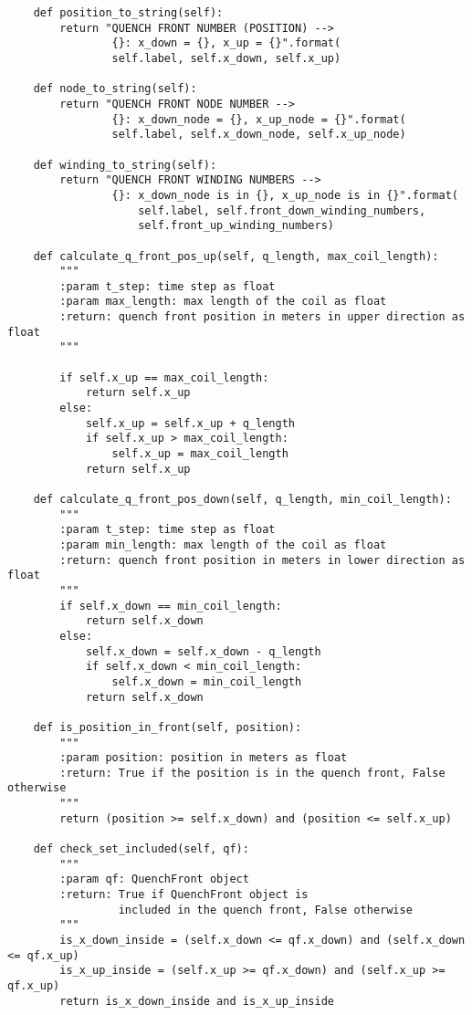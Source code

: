\begin{verbatim}
    def position_to_string(self):
        return "QUENCH FRONT NUMBER (POSITION) -->  
                {}: x_down = {}, x_up = {}".format(
                self.label, self.x_down, self.x_up)

    def node_to_string(self):
        return "QUENCH FRONT NODE NUMBER --> 
                {}: x_down_node = {}, x_up_node = {}".format(
                self.label, self.x_down_node, self.x_up_node)

    def winding_to_string(self):
        return "QUENCH FRONT WINDING NUMBERS -->  
                {}: x_down_node is in {}, x_up_node is in {}".format(
                    self.label, self.front_down_winding_numbers, 
                    self.front_up_winding_numbers)

    def calculate_q_front_pos_up(self, q_length, max_coil_length):
        """
        :param t_step: time step as float
        :param max_length: max length of the coil as float
        :return: quench front position in meters in upper direction as float
        """
        
        if self.x_up == max_coil_length:
            return self.x_up
        else:
            self.x_up = self.x_up + q_length
            if self.x_up > max_coil_length:
                self.x_up = max_coil_length
            return self.x_up

    def calculate_q_front_pos_down(self, q_length, min_coil_length):
        """
        :param t_step: time step as float
        :param min_length: max length of the coil as float
        :return: quench front position in meters in lower direction as float
        """
        if self.x_down == min_coil_length:
            return self.x_down
        else:
            self.x_down = self.x_down - q_length
            if self.x_down < min_coil_length:
                self.x_down = min_coil_length
            return self.x_down

    def is_position_in_front(self, position):
        """
        :param position: position in meters as float
        :return: True if the position is in the quench front, False otherwise
        """
        return (position >= self.x_down) and (position <= self.x_up)

    def check_set_included(self, qf):
        """
        :param qf: QuenchFront object
        :return: True if QuenchFront object is 
                 included in the quench front, False otherwise
        """
        is_x_down_inside = (self.x_down <= qf.x_down) and (self.x_down <= qf.x_up)
        is_x_up_inside = (self.x_up >= qf.x_down) and (self.x_up >= qf.x_up)
        return is_x_down_inside and is_x_up_inside


\end{verbatim}
